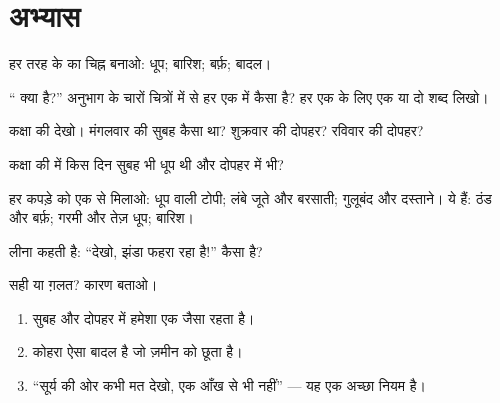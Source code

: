\section{अभ्यास}

\begin{exercise}[$\star$]\label{exo:g1:watching-the-weather:1}
हर तरह के  का चिह्न बनाओ: धूप; बारिश; बर्फ़; बादल।
\end{exercise}

\begin{exercise}[$\star$]\label{exo:g1:watching-the-weather:2}
`` क्या है?'' अनुभाग के चारों चित्रों में से हर एक में  कैसा
है? हर एक के लिए एक या दो शब्द लिखो।
\end{exercise}

\begin{exercise}[$\star$]\label{exo:g1:watching-the-weather:3}
कक्षा की  देखो। मंगलवार की सुबह  कैसा था? शुक्रवार की
दोपहर? रविवार की दोपहर?
\end{exercise}

\begin{exercise}[$\star$]\label{exo:g1:watching-the-weather:4}
कक्षा की  में किस दिन सुबह भी धूप थी और दोपहर में भी?
\end{exercise}

\begin{exercise}[$\star$]\label{exo:g1:watching-the-weather:5}
हर कपड़े को एक  से मिलाओ: धूप वाली टोपी; लंबे जूते और बरसाती;
गुलूबंद और दस्ताने।  ये हैं: ठंड और बर्फ़; गरमी और तेज़ धूप;
बारिश।
\end{exercise}

\begin{exercise}[$\star$]\label{exo:g1:watching-the-weather:6}
लीना कहती है: ``देखो, झंडा फहरा रहा है!''  कैसा है?
\end{exercise}

\begin{exercise}[$\star$]\label{exo:g1:watching-the-weather:7}
सही या ग़लत? कारण बताओ।
\begin{enumerate}
  \item सुबह और दोपहर में  हमेशा एक जैसा रहता है।
  \item कोहरा ऐसा बादल है जो ज़मीन को छूता है।
  \item ``सूर्य की ओर कभी मत देखो, एक आँख से भी नहीं'' --- यह एक अच्छा नियम है।
\end{enumerate}
\end{exercise}

